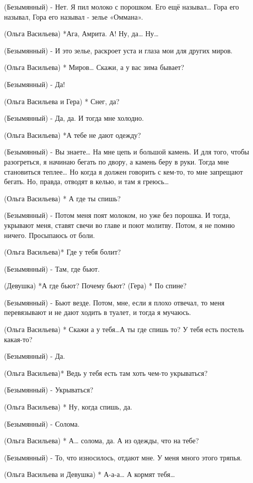 (Безымянный) - Нет. Я пил молоко с порошком. Его ещё называл… Гора его называл, Гора его называл - зелье «Оммана».

(Ольга Васильева) *Ага, Амрита. А! Ну, да… Ну…

(Безымянный) - И это зелье, раскроет уста и глаза мои  для других миров.

(Ольга Васильева) * Миров… Скажи, а у вас зима бывает?

(Безымянный) - Да!

(Ольга Васильева и Гера) * Снег, да? 

(Безымянный) - Да, да. И тогда мне холодно.

(Ольга Васильева) *А тебе не дают одежду?

(Безымянный) - Вы знаете… На мне цепь и большой камень. И для того, чтобы разогреться, я начинаю бегать по двору, а камень беру в руки. Тогда мне становиться теплее… Но когда я должен говорить с кем-то, то мне запрещают бегать. Но, правда, отводят в келью, и там я греюсь…

(Ольга Васильева) * А где ты спишь?

(Безымянный) - Потом меня поят молоком, но уже без порошка. И тогда, укрывают меня, ставят свечи во главе и поют молитву. Потом, я не помню ничего. Просыпаюсь от боли.

(Ольга Васильева)*  Где у тебя болит?

(Безымянный) - Там, где бьют. 

(Девушка) *А где бьют? Почему бьют?
(Гера) * По спине?

(Безымянный) - Бьют везде. Потом,  мне, если я плохо отвечал, то меня перевязывают и не дают ходить в туалет, и тогда я мучаюсь.

(Ольга Васильева) * Скажи а у тебя…А ты где спишь то? У тебя есть постель какая-то?

(Безымянный) - Да.

(Ольга Васильева)*  Ведь у тебя есть там хоть чем-то укрываться?

(Безымянный) - Укрываться? 

(Ольга Васильева) * Ну, когда спишь, да.

(Безымянный) - Солома.

(Ольга Васильева) * А… солома, да. А из одежды, что на тебе?

(Безымянный) - То, что износилось, отдают мне. У меня много этого тряпья. 

(Ольга Васильева и Девушка) * А-а-а… А кормят тебя…




